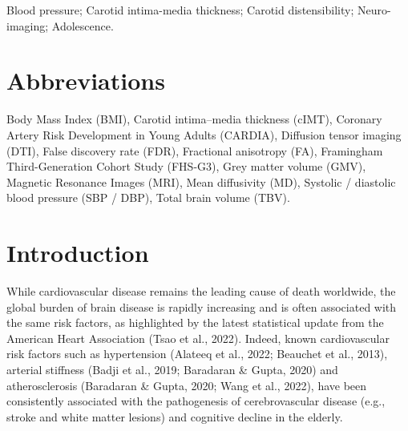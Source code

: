\documentclass[
  letterpaper,
  DIV=11,
  numbers=noendperiod]{scrreport}
\begin{document}

Blood pressure; Carotid intima-media thickness; Carotid distensibility;
Neuro-imaging; Adolescence.

\section*{Abbreviations}\label{abbreviations-3}


Body Mass Index (BMI), Carotid intima--media thickness (cIMT), Coronary
Artery Risk Development in Young Adults (CARDIA), Diffusion tensor
imaging (DTI), False discovery rate (FDR), Fractional anisotropy (FA),
Framingham Third-Generation Cohort Study (FHS-G3), Grey matter volume
(GMV), Magnetic Resonance Images (MRI), Mean diffusivity (MD), Systolic
/ diastolic blood pressure (SBP / DBP), Total brain volume (TBV).

\newpage

\section{Introduction}\label{introduction-5}

While cardiovascular disease remains the leading cause of death
worldwide, the global burden of brain disease is rapidly increasing and
is often associated with the same risk factors, as highlighted by the
latest statistical update from the American Heart Association (Tsao et
al., 2022). Indeed, known cardiovascular risk factors such as
hypertension (Alateeq et al., 2022; Beauchet et al., 2013), arterial
stiffness (Badji et al., 2019; Baradaran \& Gupta, 2020) and
atherosclerosis (Baradaran \& Gupta, 2020; Wang et al., 2022), have been
consistently associated with the pathogenesis of cerebrovascular disease
(e.g., stroke and white matter lesions) and cognitive decline in the
elderly.
\end{document}
